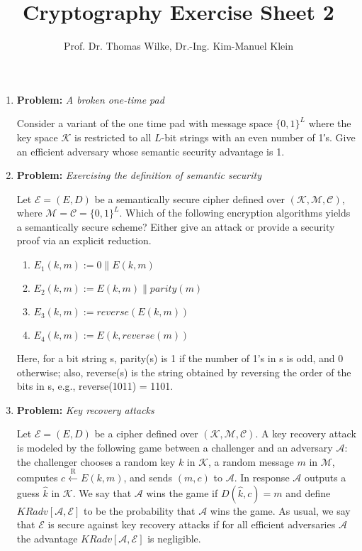 \documentclass[11pt]{article}
\begin{document}
	
	\title{\textbf{Cryptography Exercise Sheet 2}}
	\author{Prof. Dr. Thomas Wilke, Dr.-Ing. Kim-Manuel Klein}
	\maketitle
	\medskip
	
	\begin{enumerate}
		
		\item
		\textbf{Problem:} \textit{A broken one-time pad}
		
		Consider a variant of the one time pad with message space $\{0, 1\}^L$ where the key space $\mathcal{K}$ is restricted to all $L$-bit strings with an even number of 1′s. Give an efficient adversary whose semantic security advantage is 1.
	
		
	
		\item
        \textbf{Problem:} \textit{Exercising the definition of semantic security}
        
        Let $\mathcal{E} = (E,D)$ be a semantically secure cipher defined over $(\mathcal{K}, \mathcal{M}, \mathcal{C})$, where $\mathcal{M} = \mathcal{C} = \{0, 1\}^L$. Which of the following encryption
        algorithms yields a semantically secure scheme? Either give an attack or provide a security proof
        via an explicit reduction.  
        
         \begin{enumerate}
        	\item $E_1(k, m) := 0  \parallel E(k, m)$ 
        	\item $E_2(k, m) := E(k, m) \parallel parity(m)$ 
        	\item $E_3(k, m) := reverse(E(k, m))$  
        	\item $E_4(k, m) := E(k, reverse(m))$ 
        	
         \end{enumerate}
		Here, for a bit string s, parity(s) is 1 if the number of 1’s in s is odd, and 0 otherwise; also,
		reverse(s) is the string obtained by reversing the order of the bits in s, e.g., reverse(1011) = 1101.
		
		\item
		\textbf{Problem:} \textit{Key recovery attacks}
		
		Let $\mathcal{E} = (E,D)$ be a cipher defined over  $(\mathcal{K}, \mathcal{M}, \mathcal{C})$. A key recovery
		attack is modeled by the following game between a challenger and an adversary $\mathcal{A}$: the challenger chooses a random key $k$ in $\mathcal{K}$, a random message $m$ in $\mathcal{M}$, computes $c \xleftarrow{\text{R}} E(k, m)$, and sends $(m, c)$ to $\mathcal{A}$. In response $\mathcal{A}$ outputs a guess $\hat{k}$ in $\mathcal{K}$. We say that $\mathcal{A}$ wins the game if $D(\hat{k}, c) = m$ and define $KRadv[\mathcal{A}, \mathcal{E}]$ to be the probability that $\mathcal{A}$ wins the game. As usual, we say that $\mathcal{E}$ is secure against key recovery attacks if for all efficient adversaries $\mathcal{A}$ the advantage $KRadv[\mathcal{A}, \mathcal{E}]$ is negligible.
		

\end{enumerate}
\end{document}
